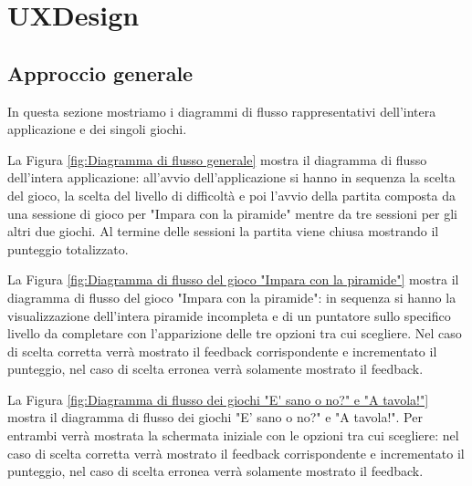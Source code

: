 \section{UXDesign} \label{sec:design}

\subsection{Approccio generale} \label{subsec:app}
In questa sezione mostriamo i diagrammi di flusso rappresentativi dell'intera applicazione e dei singoli giochi.

La Figura \ref{fig:Diagramma di flusso generale} mostra il diagramma di flusso dell'intera applicazione: all'avvio dell'applicazione si hanno in sequenza la scelta del gioco, la scelta del livello di difficoltà e poi l'avvio della partita composta da una sessione di gioco per "Impara con la piramide" mentre da tre sessioni per gli altri due giochi. Al termine delle sessioni la partita viene chiusa mostrando il punteggio totalizzato.

La Figura \ref{fig:Diagramma di flusso del gioco "Impara con la piramide"} mostra il diagramma di flusso del gioco "Impara con la piramide": in sequenza si hanno la visualizzazione dell'intera piramide incompleta e di un puntatore sullo specifico livello da completare con l'apparizione delle tre opzioni tra cui scegliere. Nel caso di scelta corretta verrà mostrato il feedback corrispondente e incrementato il punteggio, nel caso di scelta erronea verrà solamente mostrato il feedback.

La Figura \ref{fig:Diagramma di flusso dei giochi "E' sano o no?" e "A tavola!"} mostra il diagramma di flusso dei giochi "E' sano o no?" e "A tavola!". Per entrambi verrà mostrata la schermata iniziale con le opzioni tra cui scegliere: nel caso di scelta corretta verrà mostrato il feedback corrispondente e incrementato il punteggio, nel caso di scelta erronea verrà solamente mostrato il feedback.

